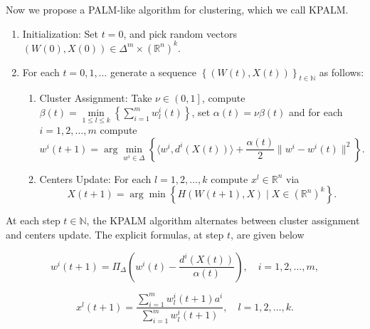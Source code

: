 \documentclass[11pt]{article}
\numberwithin{equation}{section}
\begin{document}
Now we propose a PALM-like algorithm for clustering, which we call KPALM.
\begin{enumerate}[(1)]
	\item Initialization: Set $t=0$, and pick random vectors $(W(0),X(0)) \in \Delta^m \times (\mathbb{R}^n)^k .$

	\item For each $t=0,1, \ldots$ generate a sequence $\left\lbrace(W(t),X(t))\right\rbrace_{t \in \mathbb{N}}$ as follows:
	\begin{enumerate}[(2.1)]
		\item Cluster Assignment: Take $\nu \in \left(0,1\right]$, compute $\beta(t) = \min\limits_{1 \leq l \leq k} \left\lbrace \sum\limits_{i=1}^{m} w^i_l(t)\right \rbrace$, set
		$\alpha(t)=\nu \beta(t) $ and for each $i=1, 2, \ldots ,m$ compute
		\begin{equation}
			w^i(t+1) = \arg\min\limits_{w^i \in \Delta} \left\lbrace \langle w^i , d^i(X(t)) \rangle + \frac{\alpha(t)}{2} \|w^i - w^i(t)\|^2 \right\rbrace . \label{StateEq5}
		\end{equation}
		
		\item Centers Update: For each $l=1, 2, \ldots ,k$ compute $x^l \in \mathbb{R}^n$ via
		\begin{equation}
			X(t+1) = \arg\min \left\lbrace H(W(t+1), X) \mid X \in (\mathbb{R}^n)^k \right\rbrace . \label{StateEq6}
		\end{equation}
	\end{enumerate}
\end{enumerate}

\newpage

At each step $t \in \mathbb{N}$, the KPALM algorithm alternates between cluster assignment and centers update. The explicit formulas, at step $t$, are given below

\begin{equation}
w^i(t+1) = \Pi_{\Delta} \left(w^i(t) - \frac{d^i(X(t))}{\alpha(t)}\right) , \quad i=1, 2, \ldots ,m , \label{StateEq7}
\end{equation}

\begin{equation}
x^l(t+1) = \frac{\sum_{i=1}^{m} w^i_l(t+1) a^i}{\sum_{i=1}^{m} w^i_l(t+1)} , \quad l=1, 2, \ldots ,k . \label{StateEq8}
\end{equation}
\end{document}

